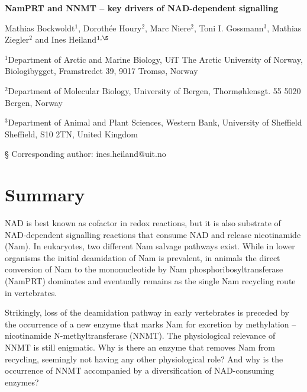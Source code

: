 \documentclass[paper=a4, 12pt]{scrartcl}
\begin{document}
\noindent
{\huge\sffamily\bfseries NamPRT and NNMT – key drivers of NAD-dependent signalling \par}

\vspace{2cm}

\noindent
Mathias Bockwoldt$^{1}$, Dorothée Houry$^{2}$,  Marc Niere$^{2}$, Toni I. Gossmann$^{3}$, Mathias Ziegler$^{2}$ and Ines Heiland$^{1,\S}$

\vspace{1cm}

\noindent
$^{1}$Department of Arctic and Marine Biology, UiT The Arctic University of Norway, Biologibygget, Framstredet 39, 9017 Tromsø, Norway

\noindent
$^{2}$Department of Molecular Biology, University of Bergen, Thormøhlensgt. 55
5020 Bergen, Norway

\noindent
$^{3}$Department of Animal and Plant Sciences, Western Bank, University of Sheffield
Sheffield, S10 2TN, United Kingdom

\noindent
§ Corresponding author: ines.heiland@uit.no


\section{Summary}

NAD is best known as cofactor in redox reactions, but it is also substrate of NAD-dependent signalling reactions that consume NAD and release nicotinamide (Nam). In eukaryotes, two different Nam salvage pathways exist. While in lower organisms the initial deamidation of Nam is prevalent, in animals the direct conversion of Nam to the mononucleotide by Nam phosphoribosyltransferase (NamPRT) dominates and eventually remains as the single Nam recycling route in vertebrates.

Strikingly, loss of the deamidation pathway in early vertebrates is preceded by the occurrence of a new enzyme that marks Nam for excretion by methylation – nicotinamide N-methyltransferase (NNMT). The physiological relevance of NNMT is still enigmatic. Why is there an enzyme that removes Nam from recycling, seemingly not having any other physiological role? And why is the occurrence of NNMT accompanied by a diversification of NAD-consuming enzymes?
\end{document}
